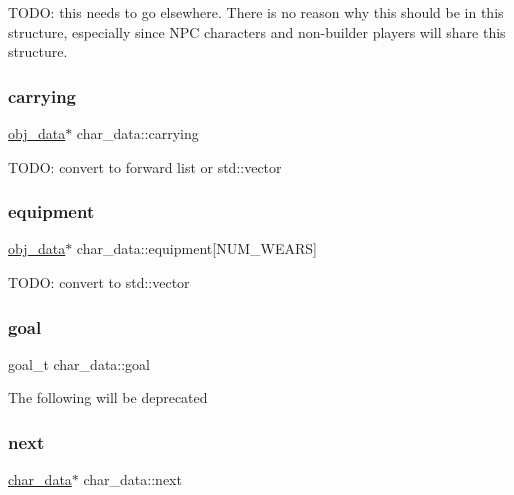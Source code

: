 T\+O\+DO\+: this needs to go elsewhere. There is no reason why this should be in this structure, especially since N\+PC characters and non-\/builder players will share this structure. \mbox{\label{structchar__data_a83029722daf46aaa509cc082063fece6}} 
\subsubsection{\texorpdfstring{carrying}{carrying}}
{\footnotesize\ttfamily \hyperlink{structobj__data}{obj\+\_\+data}$\ast$ char\+\_\+data\+::carrying}

T\+O\+DO\+: convert to forward list or std\+::vector \mbox{\label{structchar__data_a523ae967ecadc985b77427b4003548de}} 
\subsubsection{\texorpdfstring{equipment}{equipment}}
{\footnotesize\ttfamily \hyperlink{structobj__data}{obj\+\_\+data}$\ast$ char\+\_\+data\+::equipment\mbox{[}N\+U\+M\+\_\+\+W\+E\+A\+RS\mbox{]}}

T\+O\+DO\+: convert to std\+::vector \mbox{\label{structchar__data_a9ed1ce6d8adcefa2723c5812f648d08c}} 
\subsubsection{\texorpdfstring{goal}{goal}}
{\footnotesize\ttfamily goal\+\_\+t char\+\_\+data\+::goal}

The following will be deprecated \mbox{\label{structchar__data_a80b37086e290d8137e1584645c35cec4}} 
\subsubsection{\texorpdfstring{next}{next}}
{\footnotesize\ttfamily \hyperlink{structchar__data}{char\+\_\+data}$\ast$ char\+\_\+data\+::next}

